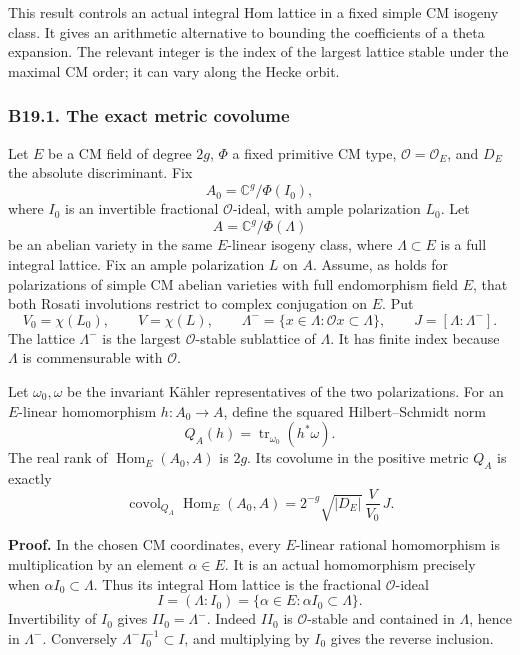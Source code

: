 \documentclass[11pt,a4paper]{article}
\theoremstyle{definition}
\begin{document}
This result controls an actual integral Hom lattice in a fixed simple CM isogeny class. It gives an arithmetic alternative to bounding the coefficients of a theta expansion. The relevant integer is the index of the largest lattice stable under the maximal CM order; it can vary along the Hecke orbit.

\subsubsection{B19.1. The exact metric covolume}\label{b19.1.-the-exact-metric-covolume}

Let \(E\) be a CM field of degree \(2g\), \(\Phi\) a fixed primitive CM type, \(\mathcal O=\mathcal O_E\), and \(D_E\) the absolute discriminant. Fix \[
 A_0=\mathbb C^g/\Phi(I_0),
\] where \(I_0\) is an invertible fractional \(\mathcal O\)-ideal, with ample polarization \(L_0\). Let \[
 A=\mathbb C^g/\Phi(\Lambda)
\] be an abelian variety in the same \(E\)-linear isogeny class, where \(\Lambda\subset E\) is a full integral lattice. Fix an ample polarization \(L\) on \(A\). Assume, as holds for polarizations of simple CM abelian varieties with full endomorphism field \(E\), that both Rosati involutions restrict to complex conjugation on \(E\). Put \[
 V_0=\chi(L_0),\qquad V=\chi(L),\qquad
 \Lambda^-=\{x\in\Lambda:\mathcal O x\subset\Lambda\},\qquad
 J=[\Lambda:\Lambda^-].
\tag{B19.1}
\] The lattice \(\Lambda^-\) is the largest \(\mathcal O\)-stable sublattice of \(\Lambda\). It has finite index because \(\Lambda\) is commensurable with \(\mathcal O\).

Let \(\omega_0,\omega\) be the invariant Kähler representatives of the two polarizations. For an \(E\)-linear homomorphism \(h:A_0\to A\), define the squared Hilbert--Schmidt norm \[
 Q_A(h)=\operatorname{tr}_{\omega_0}(h^*\omega).
\tag{B19.2}
\] The real rank of \(\operatorname{Hom}_E(A_0,A)\) is \(2g\). Its covolume in the positive metric \(Q_A\) is exactly \[
 \operatorname{covol}_{Q_A}\operatorname{Hom}_E(A_0,A)
 =2^{-g}\sqrt{|D_E|}\,\frac{V}{V_0}\,J.
\tag{B19.3}
\]

\textbf{Proof.} In the chosen CM coordinates, every \(E\)-linear rational homomorphism is multiplication by an element \(\alpha\in E\). It is an actual homomorphism precisely when \(\alpha I_0\subset\Lambda\). Thus its integral Hom lattice is the fractional \(\mathcal O\)-ideal \[
 I=(\Lambda:I_0)=\{\alpha\in E:\alpha I_0\subset\Lambda\}.
\] Invertibility of \(I_0\) gives \(I I_0=\Lambda^-\). Indeed \(I I_0\) is \(\mathcal O\)-stable and contained in \(\Lambda\), hence in \(\Lambda^-\). Conversely \(\Lambda^- I_0^{-1}\subset I\), and multiplying by \(I_0\) gives the reverse inclusion.
\end{document}
